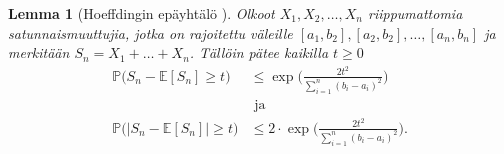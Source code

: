 \documentclass[finnish,12pt,a4paper,pdftex,sci,utf8]{aaltothesis}
\newtheorem{lemma}{Lemma}
\begin{document}
\begin{lemma}[Hoeffdingin epäyhtälö \cite{Hoeffding}]
	\label{lemma:Hoeffding}
	Olkoot $X_1, X_2, \ldots, X_n$ riippumattomia  satunnaismuuttujia, jotka on rajoitettu väleille $[a_1, b_2], [a_2, b_2], \ldots, [a_n, b_n]$ ja merkitään $S_n = X_1 + \ldots + X_n$. Tällöin pätee kaikilla $t \geq 0$
	\begin{align*}
		\mathbb{P} \big( S_n - \mathbb{E}[S_n] \geq t \big) &\leq \exp \big( \frac{2t^2}{\sum_{i=1}^{n} (b_i - a_i)^2} \big) \\
		& \text{ ja } \\
		\mathbb{P}\big(|S_n - \mathbb{E}[S_n]| \geq t \big) &\leq 2 \cdot \exp \big( \frac{2t^2}{\sum_{i=1}^{n} (b_i - a_i)^2} \big).
	\end{align*}
\end{lemma}
\end{document}
